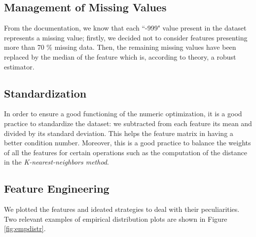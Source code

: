\documentclass[10pt,conference,compsocconf]{IEEEtran}
\begin{document}
\subsection{Management of Missing Values}
From the documentation, we know that each ``-999" value present in the dataset represents a missing value; firstly, we decided not to consider features presenting more than 70 \% missing data. Then, the remaining missing values have been replaced by the median of the feature which is, according to theory, a robust estimator.

\subsection{Standardization}
In order to ensure a good functioning of the numeric optimization, it is a good practice to standardize the dataset: we subtracted from each feature its mean and divided by its standard deviation.
This helps the feature matrix in having a better condition number. Moreover, this is a good practice to balance the weights of all the features for certain operations such as the computation of the distance in the \emph{K-nearest-neighbors method}.

\subsection{Feature Engineering}
We plotted the features and ideated strategies to deal with their peculiarities.
Two relevant examples of empirical distribution plots are shown in Figure \ref{fig:empdistr}.
\end{document}
